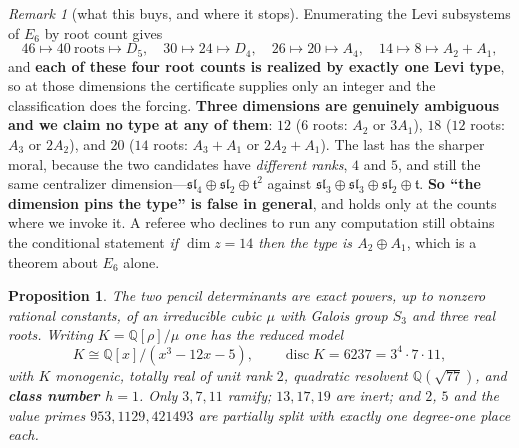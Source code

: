 \documentclass[11pt,reqno]{amsart}
\theoremstyle{plain}
\newtheorem{proposition}[theorem]{Proposition}
\theoremstyle{definition}
\theoremstyle{remark}
\newtheorem{remark}[theorem]{Remark}
\newcommand{\Q}{\mathbb{Q}}
\newcommand{\sll}{\mathfrak{sl}}
\newcommand{\disc}{\operatorname{disc}}
\begin{document}
\begin{remark}[what this buys, and where it stops]\label{rem:leviscope}
Enumerating the Levi subsystems of $E_6$ by root count gives
\[
  46\mapsto 40\ \text{roots}\mapsto D_5,\quad
  30\mapsto 24\mapsto D_4,\quad
  26\mapsto 20\mapsto A_4,\quad
  14\mapsto 8\mapsto A_2{+}A_1 ,
\]
and \textbf{each of these four root counts is realized by exactly one Levi type}, so at
those dimensions the certificate supplies only an integer and the classification does the
forcing. \textbf{Three dimensions are genuinely ambiguous and we claim no type at any of
them}: $12$ ($6$ roots: $A_2$ or $3A_1$), $18$ ($12$ roots: $A_3$ or $2A_2$), and
\textbf{$20$} ($14$ roots: $A_3{+}A_1$ or $2A_2{+}A_1$). The last has the sharper moral,
because the two candidates have \emph{different ranks}, $4$ and $5$, and still the same
centralizer dimension---$\sll_4\oplus\sll_2\oplus\mathfrak t^2$ against
$\sll_3\oplus\sll_3\oplus\sll_2\oplus\mathfrak t$. \textbf{So ``the dimension pins the
type'' is false in general}, and holds only at the counts where we invoke it. A referee
who declines to run any computation still obtains the conditional statement \emph{if
$\dim z=14$ then the type is $A_2\oplus A_1$}, which is a theorem about $E_6$ alone.
\end{remark}

\begin{proposition}\label{prop:mu}
The two pencil determinants are exact powers, up to nonzero rational constants, of an
irreducible cubic $\mu$ with Galois group $S_3$ and three real roots. Writing
$K=\Q[\rho]/\mu$ one has the reduced model
\[
   K\cong\Q[x]/(x^3-12x-5),\qquad \disc K=6237=3^4\cdot7\cdot11,
\]
with $K$ monogenic, totally real of unit rank $2$, quadratic resolvent $\Q(\sqrt{77})$,
and \textbf{class number $h=1$}. Only $3,7,11$ ramify; $13,17,19$ are inert; and $2$,
$5$ and the value primes $953,1129,421493$ are partially split with exactly one
degree-one place each.
\end{proposition}
\end{document}
